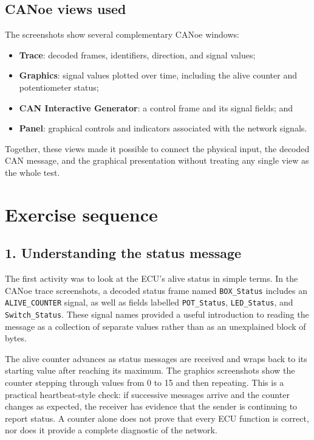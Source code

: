\documentclass[12pt,a4paper]{article}
\begin{document}
\subsection{CANoe views used}

The screenshots show several complementary CANoe windows:
\begin{itemize}
    \item \textbf{Trace}: decoded frames, identifiers, direction, and signal values;
    \item \textbf{Graphics}: signal values plotted over time, including the alive counter and potentiometer status;
    \item \textbf{CAN Interactive Generator}: a control frame and its signal fields; and
    \item \textbf{Panel}: graphical controls and indicators associated with the network signals.
\end{itemize}
Together, these views made it possible to connect the physical input, the decoded CAN message, and the graphical presentation without treating any single view as the whole test.

\section{Exercise sequence}

\subsection{1. Understanding the status message}

The first activity was to look at the ECU's alive status in simple terms. In the CANoe trace screenshots, a decoded status frame named \texttt{BOX\_Status} includes an \texttt{ALIVE\_COUNTER} signal, as well as fields labelled \texttt{POT\_Status}, \texttt{LED\_Status}, and \texttt{Switch\_Status}. These signal names provided a useful introduction to reading the message as a collection of separate values rather than as an unexplained block of bytes.

The alive counter advances as status messages are received and wraps back to its starting value after reaching its maximum. The graphics screenshots show the counter stepping through values from 0 to 15 and then repeating. This is a practical heartbeat-style check: if successive messages arrive and the counter changes as expected, the receiver has evidence that the sender is continuing to report status. A counter alone does not prove that every ECU function is correct, nor does it provide a complete diagnostic of the network.
\end{document}
